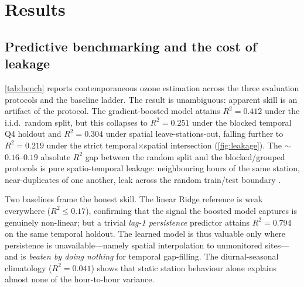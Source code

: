\section{Results}
\label{sec:results}

\subsection{Predictive benchmarking and the cost of leakage}
\cref{tab:bench} reports contemporaneous ozone estimation across the three evaluation
protocols and the baseline ladder. The result is unambiguous: apparent skill is an
artifact of the protocol. The gradient-boosted model attains $R^2=0.412$ under the
i.i.d.\ random split, but this collapses to $R^2=0.251$ under the blocked temporal Q4
holdout and $R^2=0.304$ under spatial leave-stations-out, falling further to
$R^2=0.219$ under the strict temporal$\times$spatial intersection
(\cref{fig:leakage}). The $\sim$$0.16$--$0.19$ absolute $R^2$ gap between the random
split and the blocked/grouped protocols is pure spatio-temporal leakage: neighbouring
hours of the same station, near-duplicates of one another, leak across the random
train/test boundary \citep{kaufman2012leakage,roberts2017cv}.

Two baselines frame the honest skill. The linear Ridge reference is weak everywhere
($R^2\le 0.17$), confirming that the signal the boosted model captures is genuinely
non-linear; but a trivial \emph{lag-1 persistence} predictor attains $R^2=0.794$ on the
same temporal holdout. The learned model is thus valuable only where persistence is
unavailable---namely spatial interpolation to unmonitored sites---and is \emph{beaten
by doing nothing} for temporal gap-filling. The diurnal-seasonal climatology
($R^2=0.041$) shows that static station behaviour alone explains almost none of the
hour-to-hour variance.

